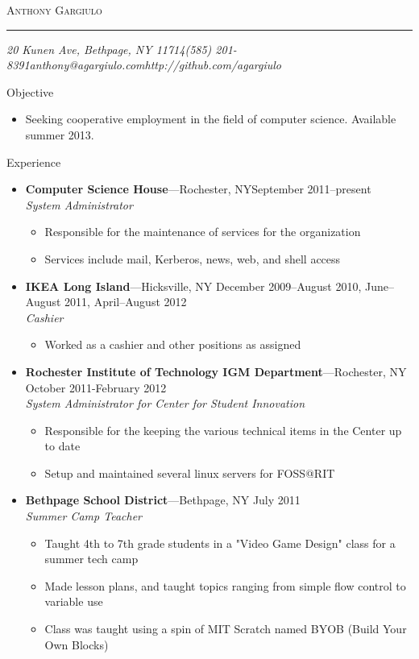 \documentclass[10pt,oneside]{article}
\makeatletter
\newcommand{\name}{Anthony Gargiulo}
\newcommand{\addr}{20 Kunen Ave, Bethpage, NY 11714}
\newcommand{\phone}{(585) 201-8391}
\newcommand{\email}{anthony@agargiulo.com}
\newcommand{\github}{http://github.com/agargiulo}
\newcommand{\bigname}[1]{
	\begin{center}\fontfamily{ppl}\selectfont\Huge\scshape#1\end{center}
}
\newenvironment{ressection}[1]{
	\vspace{3pt}
	{\fontfamily{ppl}\selectfont\Large#1}
	\begin{itemize}
	\vspace{2pt}
}{
	\end{itemize}
}
\newcommand{\ressubitem}[1]{
	\vspace{-1pt}
	\item \begin{flushleft} #1 \end{flushleft}
}
\newcommand{\resbigitem}[3]{
	\vspace{-3pt}
	\item
	\textbf{#1}---#2 \\
	\textit{#3}
}
\newenvironment{ressubsec}[3]{
	\resbigitem{#1}{#2}{#3}
	\vspace{-1pt}
	\begin{itemize}
}{
	\end{itemize}
}
\makeatother
\begin{document}
 \selectfont

\bigname{\name}

\vspace{-4pt} \rule{\textwidth}{1pt}

\vspace{-1pt} {\small\itshape \addr \hfill \phone \hfill \email \hfill \github}

\vspace{15 pt}



\begin{ressection}{Objective}

	\ressubitem{Seeking cooperative employment in the field of computer science. Available summer 2013.}

\end{ressection}
\begin{ressection}{Experience}

	\begin{ressubsec}{Computer Science House}{Rochester, NY\hfill September 2011--present}{System Administrator}
		\ressubitem{Responsible for the maintenance of services for the organization}
		\ressubitem{Services include mail, Kerberos, news, web, and shell access}
	\end{ressubsec}
	\begin{ressubsec}{IKEA Long Island}{Hicksville, NY \hfill December 2009--August 2010, June--August 2011, April--August 2012}{Cashier}
		\ressubitem{Worked as a cashier and other positions as assigned}
	\end{ressubsec}
	\begin{ressubsec}{Rochester Institute of Technology IGM Department}{Rochester, NY \hfill October 2011-February 2012}{System Administrator for Center for Student Innovation}
		\ressubitem{Responsible for the keeping the various technical items in the Center up to date}
		\ressubitem{Setup and maintained several linux servers for FOSS@RIT}
	\end{ressubsec}
	\begin{ressubsec}{Bethpage School District}{Bethpage, NY \hfill July 2011}{Summer Camp Teacher}
		\ressubitem{Taught 4th to 7th grade students in a "Video Game Design" class for a summer tech camp}
		\ressubitem{Made lesson plans, and taught topics ranging from simple flow control to variable use}
		\ressubitem{Class was taught using a spin of MIT Scratch named BYOB (Build Your Own Blocks)}
	\end{ressubsec}

\end{ressection}
\end{document}
